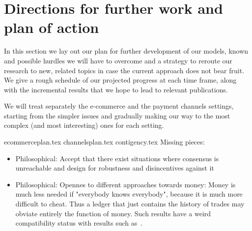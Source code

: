 \section{Directions for further work and plan of action}
\label{sec:plan}
  In this section we lay out our plan for further development of our models, known and
  possible hurdles we will have to overcome and a strategy to reroute our research to new,
  related topics in case the current approach does not bear fruit. We give a rough
  schedule of our projected progress at each time frame, along with the incremental
  results that we hope to lead to relevant publications.

  We will treat separately the e-commerce and the payment channels settings, starting from
  the simpler issues and gradually making our way to the most complex (and most
  interesting) ones for each setting.

  {ecommerceplan.tex}
  {channelsplan.tex}
  {contigency.tex}
  Missing pieces:
  \begin{itemize}
    \item Philosophical: Accept that there exist situations where consensus is
    unreachable and design for robustness and disincentives against it
    \item Philosophical: Opennes to different approaches towards money: Money is much
    less needed if "everybody knows everybody", because it is much more difficult to
    cheat. Thus a ledger that just contains the history of trades may obviate entirely
    the function of money. Such results have a weird compatibility status with results
    such as~\cite{marketequilibrium}.
  \end{itemize}
